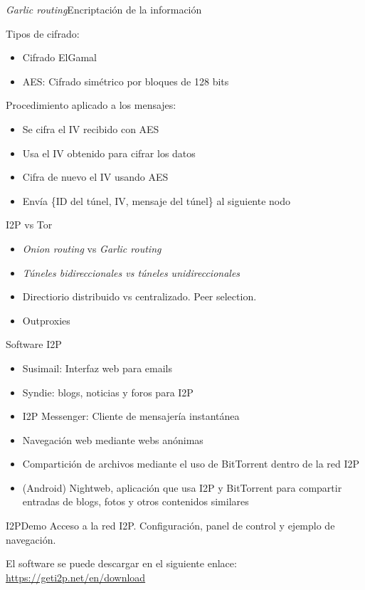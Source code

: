 \documentclass[spanish]{beamer}
\begin{document}
 \begin{frame}{\textit{Garlic routing}}{Encriptación de la información}
 
 Tipos de cifrado:
 \begin{itemize}
 	\item Cifrado ElGamal
 	\item AES: Cifrado simétrico por bloques de 128 bits
 \end{itemize}
 \vspace{1em}
 
 Procedimiento aplicado a los mensajes:
 	\begin{itemize}
 		\item Se cifra el IV recibido con AES
 		\item Usa el IV obtenido para cifrar los datos
 		\item Cifra de nuevo el IV usando AES
 		\item Envía \{ID del túnel, IV, mensaje del túnel\} al siguiente nodo
 	\end{itemize}

 
 \end{frame}
 
 
 
 \begin{frame}{I2P vs Tor}
 
 \begin{itemize}
	\item \textit{Onion routing} vs \textit{Garlic routing}
	\item \textit{Túneles bidireccionales vs túneles unidireccionales}
	\item Directiorio distribuido vs centralizado. Peer selection.
	\item Outproxies
\end{itemize}
   
\end{frame}
 
 
 \begin{frame}{Software I2P}
 	
 
 \begin{itemize}
 	\item Susimail: Interfaz web  para emails
 	\item Syndie: blogs, noticias y foros para I2P
 	\item I2P Messenger: Cliente de mensajería instantánea
 	\item Navegación web mediante webs anónimas
 	\item Compartición de archivos mediante el uso de BitTorrent dentro de la red I2P
 	\item (Android) Nightweb, aplicación que usa I2P y BitTorrent para compartir entradas
 	de blogs, fotos y otros contenidos similares
 \end{itemize}
 	
 \end{frame}

\begin{frame}{I2P}{Demo}
Acceso a la red I2P. Configuración, panel de control y ejemplo de navegación.\\

\vspace{2em}

El software se puede descargar en el siguiente enlace: \href{https://geti2p.net/en/download}{\url{https://geti2p.net/en/download}}
	
\end{frame}
\end{document}
